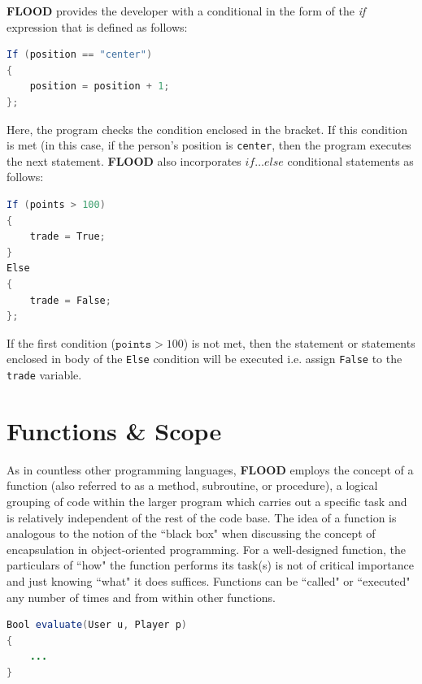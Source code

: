 \documentclass[12pt]{report}
\begin{document}
\textbf{FLOOD} provides the developer with a conditional in the form of the \textit{if} expression that is defined as follows:

\begin{singlespace}
\begin{lstlisting}[language=Java,label=some-code,caption=If conditional]
If (position == "center")
{
	position = position + 1;
};
\end{lstlisting}
\end{singlespace}

Here, the program checks the condition enclosed in the bracket. If this condition is met (in this case, if the person's position is \texttt{center}, then the program executes the next statement. \textbf{FLOOD} also incorporates \textit{$if\ldots else$} conditional statements as follows:

\begin{singlespace}
\begin{lstlisting}[language=Java,label=some-code,caption=If...Else conditional statement]
If (points > 100)
{
	trade = True;
}
Else
{
	trade = False;
};	
\end{lstlisting}
\end{singlespace}

If the first condition ($\texttt{points} > 100$) is not met, then the statement or statements enclosed in body of the \texttt{Else} condition will be executed i.e. assign \texttt{False} to the \texttt{trade} variable.

\section{Functions \& Scope}

As in countless other programming languages, \textbf{FLOOD} employs the concept of a function (also referred to as a method, subroutine, or procedure), a logical grouping of code within the larger program which carries out a specific task and is relatively independent of the rest of the code base. The idea of a function is analogous to the notion of the ``black box" when discussing the concept of encapsulation in object-oriented programming. For a well-designed function, the particulars of ``how" the function performs its task(s) is not of critical importance and just knowing ``what" it does suffices. Functions can be ``called" or ``executed" any number of times and from within other functions. 

\begin{singlespace}
\begin{lstlisting}[language=Java,label=some-code,caption=Syntax of a FLOOD function]
Bool evaluate(User u, Player p)
{
	...
} 
\end{lstlisting}
\end{singlespace}
\end{document}

